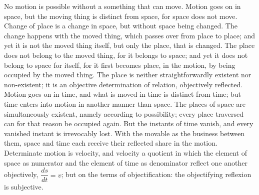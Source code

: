 \documentclass[12pt,a4paper]{book}
\begin{document}
No motion is possible without a something that can move. Motion goes on in space,
but the moving thing is distinct from space, for space does not move. Change of
place is a change in space, but without space being changed. The change happens
with the moved thing, which passes over from place to place; and yet it is not the
moved thing itself, but only the place, that is changed. The place does not belong
to the moved thing, for it belongs to space; and yet it does not belong to space
for itself, for it first becomes place, in the motion, by being occupied by the
moved thing. The place is neither straightforwardly existent nor non-existent; it
is an objective determination of relation, objectively reflected. Motion goes on in
time, and what is moved in time is distinct from time; but time enters into motion
in another manner than space. The places of space are simultaneously existent,
namely according to possibility; every place traversed can for that reason be
occupied again. But the instants of time vanish, and every vanished instant is
irrevocably lost. With the movable as the business between them, space and time
each receive their reflected share in the motion. Determinate motion is velocity,
and velocity a quotient in which the element of space as numerator and the element
of time as denominator reflect one another objectively, $\dfrac{ds}{dt} = v$; but
on the terms of objectification: the objectifying reflexion is subjective.
\end{document}
